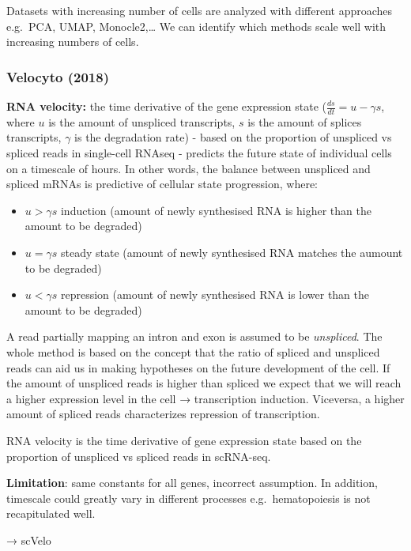 Datasets with increasing number of cells are analyzed with different
approaches e.g.~PCA, UMAP, Monocle2,\ldots{} We can identify which
methods scale well with increasing numbers of cells.

\hypertarget{velocyto-2018}{%
\subsubsection{Velocyto (2018)}\label{velocyto-2018}}

\textbf{RNA velocity:} the time derivative of the gene expression state
(\(\frac{ds}{dt}=u- \gamma s\), where $u$ is the amount of unspliced
transcripts, $s$ is the amount of splices transcripts, $\gamma$ is the
degradation rate) - based on the proportion of unspliced
vs spliced reads in single-cell RNAseq - predicts the future state of
individual cells on a timescale of hours. In other words, the balance
between unspliced and spliced mRNAs is predictive of cellular state
progression, where:

\begin{itemize}
\tightlist
\item
  \(u > \gamma s\) induction (amount of newly synthesised RNA is higher
  than the amount to be degraded)
\item
  \(u = \gamma s\) steady state (amount of newly synthesised RNA 
  matches the aumount to be degraded)
\item
  \(u < \gamma s\) repression (amount of newly synthesised RNA is lower
  than the amount to be degraded)
\end{itemize}

A read partially mapping an intron and exon is assumed to be
\emph{unspliced}. The whole method is based on the concept that the
ratio of spliced and unspliced reads can aid us in making hypotheses on
the future development of the cell. If the amount of unspliced reads is
higher than spliced we expect that we will reach a higher expression
level in the cell → transcription induction. Viceversa, a higher amount
of spliced reads characterizes repression of transcription.

RNA velocity is the time derivative of gene expression state based on
the proportion of unspliced vs spliced reads in scRNA-seq.

\textbf{Limitation}: same constants for all genes, incorrect assumption.
In addition, timescale could greatly vary in different processes
e.g.~hematopoiesis is not recapitulated well.

→ scVelo

